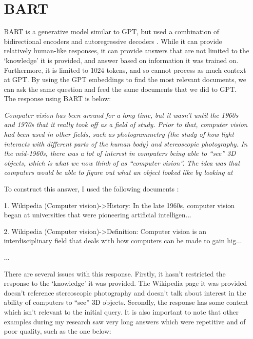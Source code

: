 \documentclass{article}
\newenvironment{itquote}
  {\begin{displayquote}\itshape}
  {\end{displayquote}\ignorespacesafterend}
\begin{document}
\section{BART}
BART is a generative model similar to GPT, but used a combination of bidirectional encoders and autoregressive decoders \citep{lewis2019bart}. While it can provide relatively human-like responses, it can provide answers that are not limited to the `knowledge' it is provided, and answer based on information it was trained on. Furthermore, it is limited to 1024 tokens, and so cannot process as much context at GPT. By using the GPT embeddings to find the most relevant documents, we can ask the same question and feed the same documents that we did to GPT. The response using BART is below:

\begin{itquote}
    Computer vision has been around for a long time, but it wasn't until the 1960s and 1970s that it really took off as a field of study. Prior to that, computer vision had been used in other fields, such as photogrammetry (the study of how light interacts with different parts of the human body) and stereoscopic photography. In the mid-1960s, there was a lot of interest in computers being able to ``see'' 3D objects, which is what we now think of as ``computer vision''. The idea was that computers would be able to figure out what an object looked like by looking at

    To construct this answer, I used the following documents : 
    
    1. Wikipedia (Computer vision)->History:
    In the late 1960s, computer vision began at universities that were pioneering artificial intelligen...
    
    2. Wikipedia (Computer vision)->Definition:
    Computer vision is an interdisciplinary field that deals with how computers can be made to gain hig...
    
   ...
\end{itquote}

There are several issues with this response. Firstly, it hasn't restricted the response to the `knowledge' it was provided. The Wikipedia page it was provided doesn't reference stereoscopic photography and doesn't talk about interest in the ability of computers to ``see'' 3D objects. Secondly, the response has some content which isn't relevant to the initial query. It is also important to note that other examples during my research saw very long answers which were repetitive and of poor quality, such as the one below:
\end{document}
